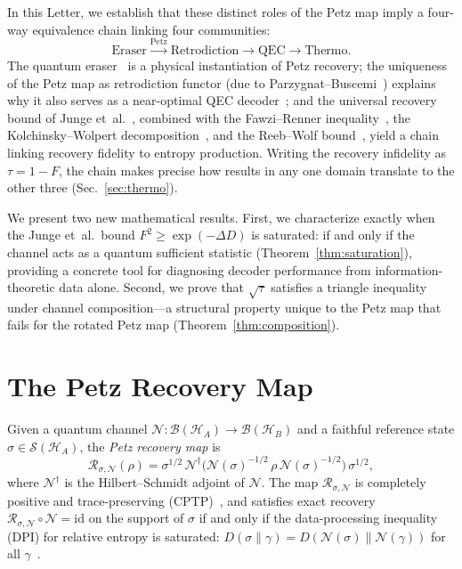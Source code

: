 \documentclass[prl,twocolumn,superscriptaddress,longbibliography,floatfix]{revtex4-2}
\newcommand{\id}{\mathrm{id}}
\newcommand{\Petz}{\mathcal{R}}
\newcommand{\chan}{\mathcal{N}}
\newcommand{\hilb}{\mathcal{H}}
\newcommand{\tauasym}{\tau}
\begin{document}
In this Letter, we establish that these distinct roles of the Petz
map imply a four-way equivalence chain linking four communities:
\begin{equation}
\text{Eraser} \xrightarrow{\text{Petz}} \text{Retrodiction}
\xrightarrow{} \text{QEC}
\xrightarrow{} \text{Thermo.}
\label{eq:flow}
\end{equation}
The quantum eraser~\cite{Scully1982,Kim2000} is a physical
instantiation of Petz recovery; the uniqueness of the Petz map as
retrodiction functor (due to
Parzygnat--Buscemi~\cite{Parzygnat2023}) explains why it also
serves as a near-optimal QEC
decoder~\cite{Barnum2002,Junge2018}; and the universal recovery
bound of Junge et~al.~\cite{Junge2018}, combined with the
Fawzi--Renner inequality~\cite{Fawzi2015}, the
Kolchinsky--Wolpert decomposition~\cite{Kolchinsky2017}, and the
Reeb--Wolf bound~\cite{ReebWolf2014}, yield a chain linking
recovery fidelity to entropy production.  Writing the recovery
infidelity as $\tauasym = 1 - F$, the chain makes precise
how results in any one domain translate to the other three
(Sec.~\ref{sec:thermo}).

We present two new mathematical results.  First, we characterize
exactly when the Junge et~al.\ bound
$F^2 \geq \exp(-\Delta D)$ is saturated: if and only if
the channel acts as a quantum sufficient statistic
(Theorem~\ref{thm:saturation}), providing a concrete tool for
diagnosing decoder performance from information-theoretic data
alone.
Second, we prove that $\sqrt{\tauasym}$ satisfies a triangle
inequality under channel composition---a structural property
unique to the Petz map that fails for the rotated Petz map
(Theorem~\ref{thm:composition}).

\section{The Petz Recovery Map}
\label{sec:petz}

Given a quantum channel $\chan: \mathcal{B}(\hilb_A) \to
\mathcal{B}(\hilb_B)$ and a faithful reference state $\sigma \in
\mathcal{S}(\hilb_A)$, the \emph{Petz recovery map} is
\begin{equation}
\Petz_{\sigma,\chan}(\rho) = \sigma^{1/2}\,
\chan^\dagger\!\big(\chan(\sigma)^{-1/2}\,\rho\,
\chan(\sigma)^{-1/2}\big)\,\sigma^{1/2},
\label{eq:petz}
\end{equation}
where $\chan^\dagger$ is the Hilbert--Schmidt adjoint of $\chan$.
The map $\Petz_{\sigma,\chan}$ is completely positive and trace-preserving
(CPTP)~\cite{Petz1986}, and satisfies exact recovery
$\Petz_{\sigma,\chan} \circ \chan = \id$ on the support of $\sigma$ if
and only if the data-processing inequality (DPI) for relative entropy is
saturated: $D(\sigma\|\gamma) = D(\chan(\sigma)\|\chan(\gamma))$ for all
$\gamma$~\cite{Petz1988}.
\end{document}
